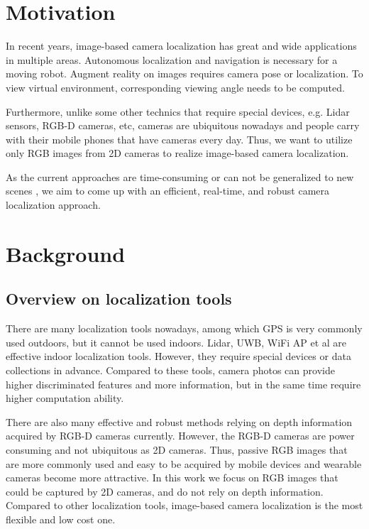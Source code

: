 \section{Motivation}

In recent years, image-based camera localization has great and wide applications in multiple areas. Autonomous localization and navigation is necessary for a moving robot. Augment reality on images requires camera pose or localization. To view virtual environment, corresponding viewing angle needs to be computed.

Furthermore, unlike some other technics that require special devices, e.g. Lidar sensors, RGB-D cameras, etc, cameras are ubiquitous nowadays and people carry with their mobile phones that have cameras every day. Thus, we want to utilize only RGB images from 2D cameras to realize image-based camera localization.

As the current approaches are time-consuming \cite{brachmann2017dsac} or can not be generalized to new scenes \cite{wu2017delving}, we aim to come up with an efficient, real-time, and robust camera localization approach.


\section{Background}

\subsection{Overview on localization tools}

There are many localization tools nowadays, among which GPS is very commonly used outdoors, but it cannot be used indoors. Lidar, UWB, WiFi AP et al are effective indoor localization tools. However, they require special devices or data collections in advance. Compared to these tools, camera photos can provide higher discriminated features and more information, but in the same time require higher computation ability.

There are also many effective and robust methods relying on depth information acquired by RGB-D cameras currently. However, the RGB-D cameras are power consuming and not ubiquitous as 2D cameras. Thus, passive RGB images that are more commonly used and easy to be acquired by mobile devices and wearable cameras become more attractive. In this work we focus on RGB images that could be captured by 2D cameras, and do not rely on depth information. Compared to other localization tools, image-based camera localization is the most flexible and low cost one.


